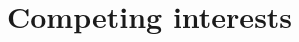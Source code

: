 \documentclass[11pt,a4paper]{article}
\begin{document}
\section*{Competing interests}


% 
\end{document}
